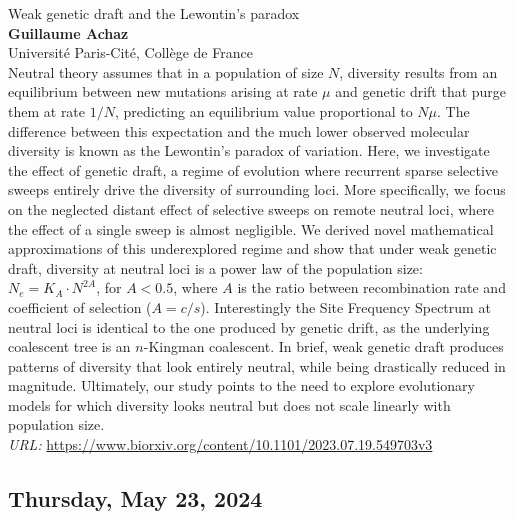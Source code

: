 \documentclass[12pt,a4paper]{article}
\begin{document}
\noindent
{\Large Weak genetic draft and the Lewontin’s paradox}\\[1ex]
{\large 
\textbf{Guillaume Achaz}\\[1ex] Université Paris-Cité, Collège de France}\\[2ex]
Neutral theory assumes that in a population of size $N$, diversity results from an equilibrium between new mutations arising at rate $\mu$ and genetic drift that purge them at rate $1/N$, predicting an equilibrium value proportional to $N\mu$. The difference between this expectation and the much lower observed molecular diversity is known as the Lewontin’s paradox of variation. Here, we investigate the effect of genetic draft, a regime of evolution where recurrent sparse selective sweeps entirely drive the diversity of surrounding loci. More specifically, we focus on the neglected distant effect of selective sweeps on remote neutral loci, where the effect of a single sweep is almost negligible. We derived novel mathematical approximations of this underexplored regime and show that under weak genetic draft, diversity at neutral loci is a power law of the population size: $N_e = K_A \cdot N^{2A}$, for $A < 0.5$, where $A$ is the ratio between recombination rate and coefficient of selection ($A = c/s$). Interestingly the Site Frequency Spectrum at neutral loci is identical to the one produced by genetic drift, as the underlying coalescent tree is an $n$-Kingman coalescent. In brief, weak genetic draft produces patterns of diversity that look entirely neutral, while being drastically reduced in magnitude. Ultimately, our study points to the need to explore evolutionary models for which diversity looks neutral but does not scale linearly with population size. 
\\ {\em URL:} \url{https://www.biorxiv.org/content/10.1101/2023.07.19.549703v3}

\newpage

\subsection*{\sffamily Thursday, May 23, 2024}
\end{document}

